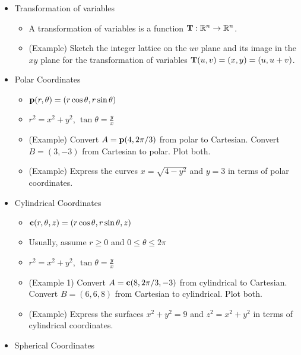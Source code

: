 \documentclass[11pt]{article}
\begin{document}
\begin{itemize}
  \item Transformation of variables
    \begin{itemize}
      \item A transformation of variables is a function
            \(\mathbf{T}:\mathbb R^n\to\mathbb R^n\).
      \item (Example) Sketch the integer lattice on the \(uv\) plane and
            its image in the \(xy\) plane for
            the transformation of variables \(\mathbf{T}(u,v)=(x,y)=(u,u+v)\).
    \end{itemize}
  \item Polar Coordinates
    \begin{itemize}
      \item \(\mathbf{p}(r,\theta)=(r\cos\theta,r\sin\theta)\)
      \item \(r^2=x^2+y^2\), \(\tan\theta=\frac{y}{x}\)
      \item (Example)
            Convert \(A=\mathbf{p}(4,2\pi/3)\) from polar to Cartesian.
            Convert \(B=(3,-3)\) from Cartesian to polar. Plot both.
      \item (Example)
            Express the curves \(x=\sqrt{4-y^2}\) and \(y=3\) in terms
            of polar coordinates.
    \end{itemize}
  \item Cylindrical Coordinates
    \begin{itemize}
      \item \(\mathbf{c}(r,\theta,z)=(r\cos\theta,r\sin\theta,z)\)
      \item Usually, assume \(r\geq0\) and \(0\leq\theta\leq2\pi\)
      \item \(r^2=x^2+y^2\), \(\tan\theta=\frac{y}{x}\)
      \item (Example 1) Convert \(A=\mathbf{c}(8,2\pi/3,-3)\) from cylindrical to
            Cartesian. Convert \(B=(6,6,8)\) from Cartesian to cylindrical.
            Plot both.
      \item (Example) Express the surfaces \(x^2+y^2=9\) and \(z^2=x^2+y^2\)
            in terms of cylindrical coordinates.
    \end{itemize}
  \item Spherical Coordinates
\end{itemize}
\end{document}
